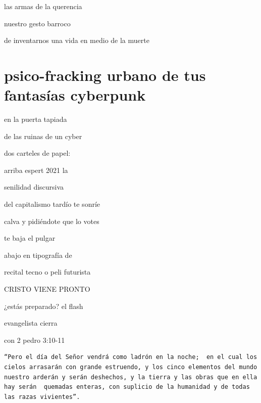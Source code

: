 \documentclass[
]{book}
\begin{document}
las armas de la querencia

nuestro gesto barroco

de inventarnos una vida en medio de la muerte

\hypertarget{psico-fracking-urbano-de-tus-fantasuxedas-cyberpunk}{%
\chapter{psico-fracking urbano de tus fantasías cyberpunk}\label{psico-fracking-urbano-de-tus-fantasuxedas-cyberpunk}}

en la puerta tapiada

de las ruinas de un cyber

dos carteles de papel:

arriba espert 2021 la

senilidad discursiva

del capitalismo tardío te sonríe

calva y pidiéndote que lo votes

te baja el pulgar

abajo en tipografía de

recital tecno o peli futurista

CRISTO VIENE PRONTO

¿estás preparado? el flash

evangelista cierra

con 2 pedro 3:10-11

\begin{verbatim}
“Pero el día del Señor vendrá como ladrón en la noche;  en el cual los cielos arrasarán con grande estruendo, y los cinco elementos del mundo nuestro arderán y serán deshechos, y la tierra y las obras que en ella hay serán  quemadas enteras, con suplicio de la humanidad y de todas las razas vivientes”. 
\end{verbatim}

  
\end{document}

